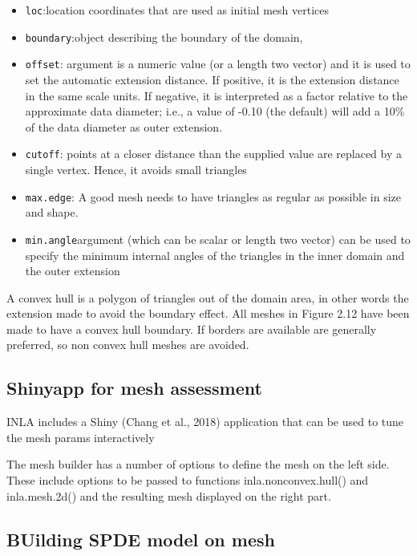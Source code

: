 \documentclass[
  12pt,
  a4paper,
  oneside]{book}
\providecommand{\tightlist}{%
  \setlength{\itemsep}{0pt}\setlength{\parskip}{0pt}}
\theoremstyle{definition}
\theoremstyle{definition}
\theoremstyle{definition}
\theoremstyle{remark}
\begin{document}
\begin{itemize}
\tightlist
\item
  \texttt{loc}:location coordinates that are used as initial mesh vertices
\item
  \texttt{boundary}:object describing the boundary of the domain,
\item
  \texttt{offset}: argument is a numeric value (or a length two vector) and it is used
  to set the automatic extension distance. If positive, it is the extension distance
  in the same scale units. If negative, it is interpreted as a factor relative to the
  approximate data diameter; i.e., a value of -0.10 (the default) will add a 10\%
  of the data diameter as outer extension.
\item
  \texttt{cutoff}: points at a closer distance than the supplied value are replaced by a single vertex. Hence, it avoids small triangles
\item
  \texttt{max.edge}: A good mesh needs to have triangles as regular as possible in size and shape.
\item
  \texttt{min.angle}argument (which can be scalar or length two vector) can be used to specify the minimum internal angles of the triangles in the inner domain and the outer extension
\end{itemize}

A convex hull is a polygon of triangles out of the domain area, in other words the extension made to avoid the boundary effect. All meshes in Figure 2.12 have been made to have a convex hull boundary. If borders are available are generally preferred, so non convex hull meshes are avoided.

\hypertarget{shinyapp-for-mesh-assessment}{%
\subsection{Shinyapp for mesh assessment}\label{shinyapp-for-mesh-assessment}}

INLA includes a Shiny (Chang et al., 2018) application that can be used to tune the mesh params interactively

The mesh builder has a number of options to define the mesh on the left side. These include options to be passed to functions inla.nonconvex.hull() and inla.mesh.2d() and the resulting mesh displayed on the right part.

\hypertarget{building-spde-model-on-mesh}{%
\subsection{BUilding SPDE model on mesh}\label{building-spde-model-on-mesh}}
\end{document}
